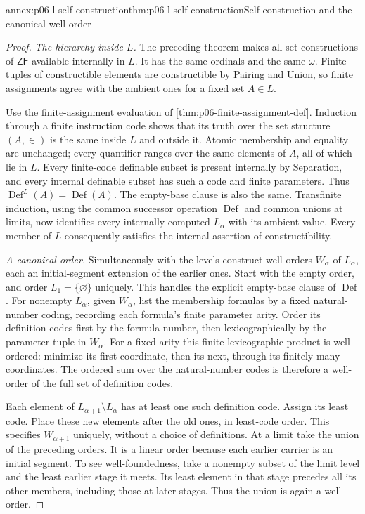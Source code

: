 \begin{annexitem}{annex:p06-l-self-construction}{thm:p06-l-self-construction}{Self-construction and the canonical well-order}
\begin{proof}
\emph{The hierarchy inside \(L\).}
The preceding theorem makes all set constructions of
\(\mathsf{ZF}\) available internally in \(L\).
It has the same ordinals and the same \(\omega\).
Finite tuples of constructible elements are constructible
by Pairing and Union, so finite assignments agree with
the ambient ones for a fixed set \(A\in L\).

Use the finite-assignment evaluation of
\cref{thm:p06-finite-assignment-def}.
Induction through a finite instruction code shows that its
truth over the set structure \((A,\in)\) is the same
inside \(L\) and outside it. Atomic membership and equality
are unchanged; every quantifier ranges over the same
elements of \(A\), all of which lie in \(L\).
Every finite-code definable subset is present internally by
Separation, and every internal definable subset has such
a code and finite parameters. Thus
\(\operatorname{Def}^L(A)=\operatorname{Def}(A)\).
The empty-base clause is also the same.
Transfinite induction, using the common successor
operation \(\operatorname{Def}\) and common unions at limits,
now identifies every internally computed \(L_\alpha\)
with its ambient value. Every member of \(L\) consequently
satisfies the internal assertion of constructibility.

\emph{A canonical order.}
Simultaneously with the levels construct well-orders \(W_\alpha\)
of \(L_\alpha\), each an initial-segment extension of the earlier ones.
Start with the empty order, and order
\(L_1=\{\varnothing\}\) uniquely. This handles the explicit
empty-base clause of \(\operatorname{Def}\).
For nonempty \(L_\alpha\), given \(W_\alpha\), list the
membership formulas by a fixed
natural-number coding, recording each formula's finite
parameter arity.
Order its definition codes first by the formula number,
then lexicographically by the parameter tuple in \(W_\alpha\).
For a fixed arity this finite lexicographic product is
well-ordered: minimize its first coordinate, then its next,
through its finitely many coordinates.
The ordered sum over the natural-number codes is therefore
a well-order of the full set of definition codes.

Each element of
\(L_{\alpha+1}\setminus L_\alpha\) has at least one such
definition code. Assign its least code.
Place these new elements after the old ones, in least-code order.
This specifies \(W_{\alpha+1}\) uniquely, without a choice
of definitions.
At a limit take the union of the preceding orders.
It is a linear order because each earlier carrier is an
initial segment. To see well-foundedness, take a nonempty
subset of the limit level and the least earlier stage
it meets. Its least element in that stage precedes
all its other members, including those at later stages.
Thus the union is again a well-order.


\end{proof}
\end{annexitem}
